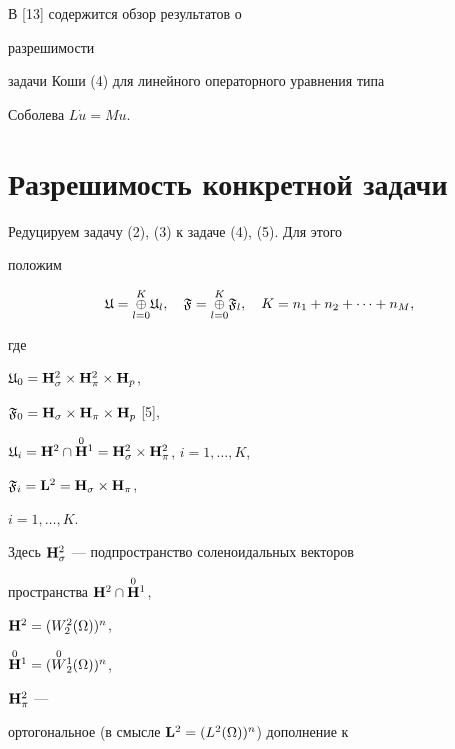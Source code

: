 \begin{note} В [13] содержится обзор результатов о


разрешимости


задачи Коши (4) для линейного операторного уравнения типа


Соболева $L\Dot u=Mu$.


\end{note}





\section{Разрешимость конкретной задачи}





Редуцируем задачу (2), (3) к задаче (4), (5). Для этого


положим


\begin{equation}


\frak U=\overset{K}{\underset{l=0}{\oplus}}{}\frak U_l,\quad


\frak F=\overset{K}{\underset{l=0}{\oplus}}{}\frak F_l,\quad


K=n_1+n_2+\dotsb+n_M,


\end{equation}


где 


$\frak U_0=\bold H^2_\sigma\times\bold H^2_\pi\times\bold H_p$,


$\frak F_0=\bold H_\sigma\times\bold H_\pi\times\bold H_p$ [5],


$\frak U_i=\bh^2\cap\overset{0}{\bh}{}^1=


\bh^2_\sigma\times\bh^2_\pi$, $i=1,\dotsc,K$,


$\frak F_i=\bold L^2=\bold H_\sigma\times\bold H_\pi$,


$i=1,\dotsc,K$.





Здесь $\bold H^2_\sigma$ --- подпространство соленоидальных векторов


пространства $\bold H^2\cap\overset{0}{\bold H}{}^1$,


$\bold H^2=(W^2_2(\Omega))^n$,


$\overset{0}{\bold H}{}^1=(\overset{0}{W}{}^1_2(\Omega))^n$,


$\bold H^2_\pi$ ---


ортогональное (в смысле $\bold L^2=(L^2(\Omega))^n$) дополнение к


